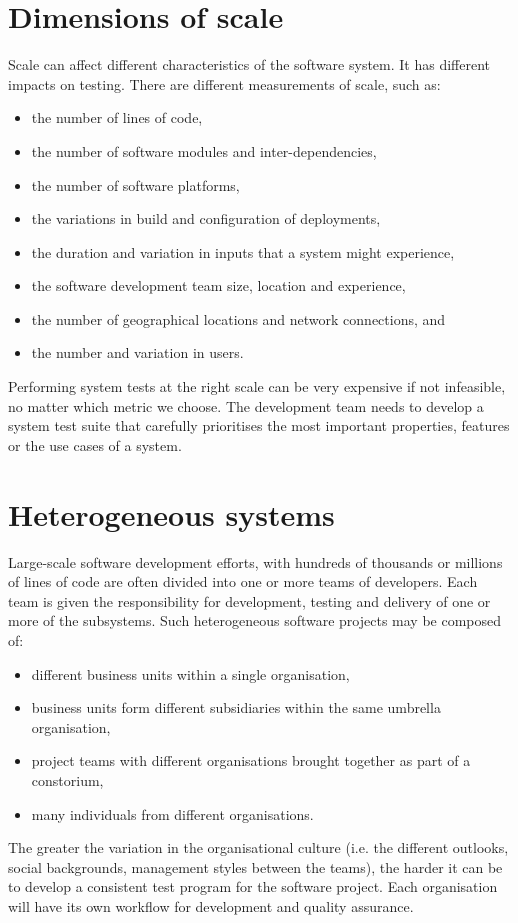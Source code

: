 \documentclass[a4paper, openany]{memoir}
\begin{document}
\section{Dimensions of scale}
Scale can affect different characteristics of the software system. It has different impacts on testing. There are different measurements of scale, such as:
\begin{itemize}
    \item the number of lines of code,
    \item the number of software modules and inter-dependencies,
    \item the number of software platforms,
    \item the variations in build and configuration of deployments,
    \item the duration and variation in inputs that a system might experience,
    \item the software development team size, location and experience,
    \item the number of geographical locations and network connections, and
    \item the number and variation in users.
\end{itemize}

Performing system tests at the right scale can be very expensive if not infeasible, no matter which metric we choose. The development team needs to develop a system test suite that carefully prioritises the most important properties, features or the use cases of a system.

\section{Heterogeneous systems}
Large-scale software development efforts, with hundreds of thousands or millions of lines of code are often divided into one or more teams of developers. Each team is given the responsibility for development, testing and delivery of one or more of the subsystems. Such heterogeneous software projects may be composed of:
\begin{itemize}
    \item different business units within a single organisation,
    \item business units form different subsidiaries within the same umbrella organisation,
    \item project teams with different organisations brought together as part of a constorium,
    \item many individuals from different organisations.
\end{itemize}
The greater the variation in the organisational culture (i.e. the different outlooks, social backgrounds, management styles between the teams), the harder it can be to develop a consistent test program for the software project. Each organisation will have its own workflow for development and quality assurance. 
\end{document}
